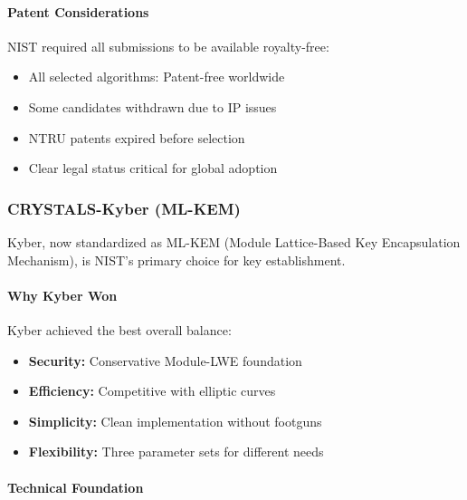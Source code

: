 \documentclass[11pt,a4paper]{article}
\begin{document}
\paragraph{Patent Considerations}

NIST required all submissions to be available royalty-free:
\begin{itemize}
    \item All selected algorithms: Patent-free worldwide
    \item Some candidates withdrawn due to IP issues
    \item NTRU patents expired before selection
    \item Clear legal status critical for global adoption
\end{itemize}

\subsubsection{CRYSTALS-Kyber (ML-KEM)}

Kyber, now standardized as ML-KEM (Module Lattice-Based Key Encapsulation Mechanism), is NIST's primary choice for key establishment.

\paragraph{Why Kyber Won}

Kyber achieved the best overall balance:
\begin{itemize}
    \item \textbf{Security:} Conservative Module-LWE foundation
    \item \textbf{Efficiency:} Competitive with elliptic curves
    \item \textbf{Simplicity:} Clean implementation without footguns
    \item \textbf{Flexibility:} Three parameter sets for different needs
\end{itemize}

\paragraph{Technical Foundation}
\end{document}
